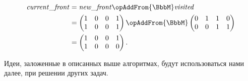 \begin{example}
    \begin{align*}
        \mathit{current\_front} & = \mathit{new\_front} \opAddFrom{\BbbM} \mathit{visited} \\
                              &=
        \begin{pmatrix}
            1 & 0 & 0 & 1 \\
            1 & 0 & 0 & 1
        \end{pmatrix} \opAddFrom{\BbbM}
        \begin{pmatrix}
            0 & 1 & 1 & 0 \\
            0 & 0 & 1 & 1
        \end{pmatrix}        \\ &=
        \begin{pmatrix}
            1 & 0 & 0 & 1 \\
            1 & 0 & 0 & 0
        \end{pmatrix}.
    \end{align*}

\end{example}

Идеи, заложенные в описанных выше алгоритмах, будут использоваться нами далее, при решении других задач.

